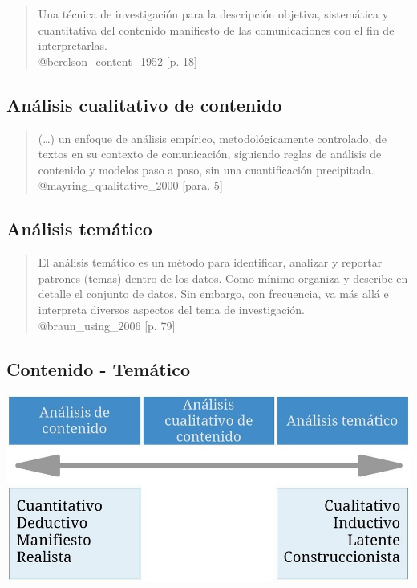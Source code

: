 \begin{quote}
Una técnica de investigación para la descripción {objetiva, sistemática
y cuantitativa} del contenido {manifiesto} de las comunicaciones con el
fin de interpretarlas.\\
@berelson\_content\_1952 {[}p. 18{]}
\end{quote}

\hypertarget{analisis-cualitativo-contenido}{%
\subsection{Análisis cualitativo de
contenido}\label{analisis-cualitativo-contenido}}

\begin{quote}
(\ldots{}) un enfoque de análisis empírico, metodológicamente
{controlado}, de textos en su contexto de comunicación, siguiendo reglas
de análisis de contenido y modelos paso a paso, {sin una cuantificación
precipitada}.\\
@mayring\_qualitative\_2000 {[}para. 5{]}
\end{quote}

\hypertarget{analisis-tematico}{%
\subsection{Análisis temático}\label{analisis-tematico}}

\begin{quote}
El análisis temático es un método para identificar, analizar y reportar
patrones (temas) dentro de los datos. Como mínimo {organiza y describe}
en detalle el conjunto de datos. Sin embargo, con frecuencia, va más
allá e {interpreta} diversos aspectos del tema de investigación.\\
@braun\_using\_2006 {[}p. 79{]}
\end{quote}

\hypertarget{contenido-tematico}{%
\subsection{Contenido - Temático}\label{contenido-tematico}}

\includegraphics{imagenes-cuali/ContenidoTematico.jpg}

